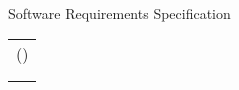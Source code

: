\begin{titlepage}
    \begin{chaptersize}
        \sffamily{}\projectTitle{}\\[0.25\baselineskip]
    \end{chaptersize}
    \begin{sectionsize}
        \sffamily{}Software Requirements Specification
    \end{sectionsize}

    \begin{center}
        \vspace{120mm}

        \begin{subsectionsize}
            \begin{center}
                \begin{tabularx}{\textwidth}{L}
                    \authorAshhar{} (\authorAshharRoll{}) \\
                    \courseName{}                         \\
                    \publishDate{}                        \\
                \end{tabularx}
            \end{center}

            \null\vfill

            \textbf{%
                \departmentName{}\linebreak
                \facultyName{}\linebreak
                \collegeName{}
            }
        \end{subsectionsize}
    \end{center}
\end{titlepage}
